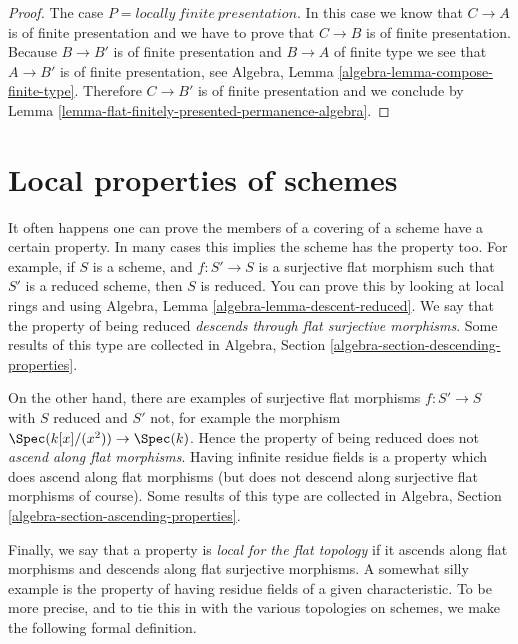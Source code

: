 \begin{proof}
\medskip\noindent
The case $P = locally\ finite\ presentation$.
In this case we know that $C \to A$ is of finite presentation and
we have to prove that $C \to B$ is of finite presentation.
Because $B \to B'$ is of finite presentation and $B \to A$
of finite type we see that $A \to B'$ is of finite presentation, see
Algebra, Lemma \ref{algebra-lemma-compose-finite-type}.
Therefore $C \to B'$ is of finite presentation and we conclude by
Lemma \ref{lemma-flat-finitely-presented-permanence-algebra}.
\end{proof}










\section{Local properties of schemes}
\label{section-descending-properties}

\noindent
It often happens one can prove the members of a covering of a scheme
have a certain property. In many cases this implies the scheme has the
property too. For example, if $S$ is a scheme, and $f : S' \to S$
is a surjective flat morphism such that $S'$ is a reduced scheme, then $S$ is
reduced. You can prove this by looking at local rings and using
Algebra, Lemma \ref{algebra-lemma-descent-reduced}.
We say that the property of being reduced
{\it descends through flat surjective morphisms}.
Some results of this type are collected in
Algebra, Section \ref{algebra-section-descending-properties}.

\medskip\noindent
On the other hand, there are examples of surjective flat morphisms
$f : S' \to S$ with $S$ reduced and $S'$ not, for example the morphism
$\Spec(k[x]/(x^2)) \to \Spec(k)$. Hence the property of
being reduced does not {\it ascend along flat morphisms}. Having infinite
residue fields is a property which does ascend along flat morphisms (but
does not descend along surjective flat morphisms of course). Some results
of this type are collected in
Algebra, Section \ref{algebra-section-ascending-properties}.

\medskip\noindent
Finally, we say that a property is {\it local for the flat topology}
if it ascends along flat morphisms and descends along flat surjective
morphisms. A somewhat silly example is the property of having residue
fields of a given characteristic. To be more precise, and to tie this in
with the various topologies on schemes, we make the following
formal definition.

